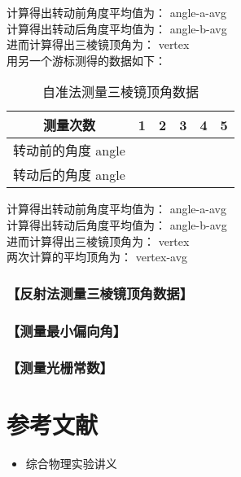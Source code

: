 \documentclass{ctexart}
\let\oldsubsubsection\subsubsection
\renewcommand{\subsubsection}[1]{\oldsubsubsection{\!\!\!\!\!\!【#1】}}
\begin{document}
计算得出转动前角度平均值为：{{ angle-a-avg }} \\
计算得出转动后角度平均值为：{{ angle-b-avg }} \\
进而计算得出三棱镜顶角为：{{ vertex }} \\

用另一个游标测得的数据如下：

\begin{table}[H]
  \centering
  \begin{tabular}{|c|c|c|c|c|c|}
    \hline
     测量次数           & 1 & 2 & 3 & 4 & 5 \\\hline
     转动前的角度 {{ angle }}\\\hline
     转动后的角度 {{ angle }}\\\hline
  \end{tabular}
  \caption{自准法测量三棱镜顶角数据}
\end{table}

计算得出转动前角度平均值为：{{ angle-a-avg }} \\
计算得出转动后角度平均值为：{{ angle-b-avg }} \\
进而计算得出三棱镜顶角为：{{ vertex }} \\
两次计算的平均顶角为：{{ vertex-avg }}

\subsubsection{反射法测量三棱镜顶角数据}

\subsubsection{测量最小偏向角}

\subsubsection{测量光栅常数}

\section{参考文献}
\begin{itemize}[leftmargin=0pt]
  \item[] 综合物理实验讲义
\end{itemize}
\end{document}
